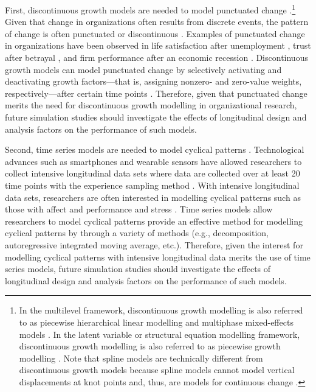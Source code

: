 \documentclass[
12pt, %
twoside,
english]{guelphthesis}
\begin{document}
First, discontinuous growth models are needed to model punctuated change \autocite{bliese2016,bliese2020}.\footnote{In the multilevel framework, discontinuous growth modelling is also referred to as piecewise hierarchical linear modelling \parencite{raudenbush2002} and multiphase mixed-effects models \parencite{cudeck2002}. In the latent variable or structural equation modelling framework, discontinuous growth modelling is also referred to as piecewise growth modelling \parencites{chou2004}{kohli2013}. Note that spline models are technically different from discontinuous growth models because spline models cannot model vertical displacements at knot points and, thus, are models for continuous change \parencite[for a review, see][]{edwards2017}.} Given that change in organizations often results from discrete events, the pattern of change is often punctuated or discontinuous \autocite{morgeson2015}. Examples of punctuated change in organizations have been observed in life satisfaction after unemployment \autocite{lucas2004}, trust after betrayal \autocite{fulmer2015}, and firm performance after an economic recession \autocites{kim2014b}[for more examples, see][]{bliese2016}. Discontinuous growth models can model punctuated change by selectively activating and deactivating growth factors---that is, assigning nonzero- and zero-value weights, respectively---after certain time points \autocite{bliese2016}. Therefore, given that punctuated change merits the need for discontinuous growth modelling in organizational research, future simulation studies should investigate the effects of longitudinal design and analysis factors on the performance of such models.

Second, time series models are needed to model cyclical patterns \autocite{pickup2014}. Technological advances such as smartphones and wearable sensors have allowed researchers to collect intensive longitudinal data sets where data are collected over at least 20 time points \autocite{collins2006} with the experience sampling method \autocite{larson2014}. With intensive longitudinal data sets, researchers are often interested in modelling cyclical patterns such as those with affect and performance \autocite{dalal2014} and stress \autocite{fuller2003}. Time series models allow researchers to model cyclical patterns provide an effective method for modelling cyclical patterns by through a variety of methods (e.g., decomposition, autoregressive integrated moving average, etc.). Therefore, given the interest for modelling cyclical patterns with intensive longitudinal data merits the use of time series models, future simulation studies should investigate the effects of longitudinal design and analysis factors on the performance of such models.
\end{document}
